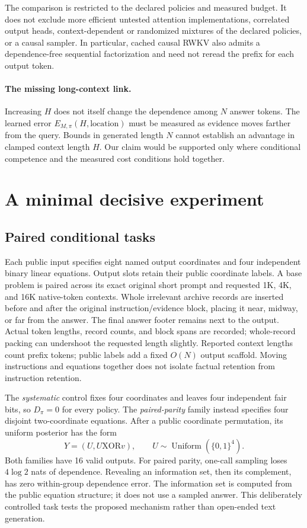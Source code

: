 \documentclass{article}
\begin{document}
The comparison is restricted to the declared policies and measured budget. It
does not exclude more efficient untested attention implementations, correlated
output heads, context-dependent or randomized mixtures of the declared
policies, or a causal sampler. In particular, cached causal RWKV also admits
a dependence-free sequential factorization and need not reread the prefix for
each output token.

\paragraph{The missing long-context link.}
Increasing $H$ does not itself change the dependence among $N$ answer tokens.
The learned error $E_{M,\pi}(H,\mathrm{location})$ must be measured as evidence
moves farther from the query. Bounds in generated length $N$ cannot establish
an advantage in clamped context length $H$. Our claim would be supported only
where conditional competence and the measured cost conditions hold together.

\section{A minimal decisive experiment}
\subsection{Paired conditional tasks}
Each public input specifies eight named output coordinates and four independent
binary linear equations. Output slots retain their public coordinate labels.
A base problem is paired across its exact original short prompt and requested
1K, 4K, and 16K native-token contexts. Whole irrelevant archive records are
inserted before and after the original instruction/evidence block, placing it
near, midway, or far from the answer. The final answer footer remains next to
the output. Actual token lengths, record counts, and block spans are recorded;
whole-record packing can undershoot the requested length slightly.
Reported context lengths count prefix tokens; public labels add a fixed
$O(N)$ output scaffold. Moving instructions and equations together does not
isolate factual retention from instruction retention.

The \emph{systematic} control fixes four coordinates and leaves four independent
fair bits, so $D_\pi=0$ for every policy. The \emph{paired-parity} family instead
specifies four disjoint two-coordinate equations. After a public coordinate
permutation, its uniform posterior has the form
\begin{equation}
 Y=(U,U\mathbin{\mathrm{XOR}}v),\qquad
 U\sim\operatorname{Uniform}(\{0,1\}^4).
\end{equation}
Both families have 16 valid outputs. For paired parity, one-call sampling
loses $4\log2$ nats of dependence. Revealing an information set, then its
complement, has zero within-group dependence error. The information set is
computed from the public equation structure; it does not use a sampled answer.
This deliberately controlled task tests the proposed mechanism rather than
open-ended text generation.
\end{document}
